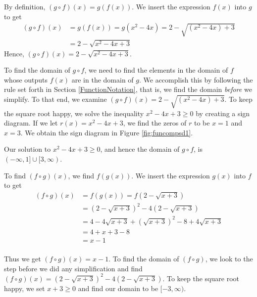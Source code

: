 {
By definition, $(g \circ f)(x) = g(f(x))$. 
We insert the expression $f(x)$ into $g$ to get  
\begin{align*}
(g \circ f)(x) &= g(f(x)) = g\left(x^2-4x\right) = 2 - \sqrt{\left(x^2-4x\right)+3}\\
& = 2 - \sqrt{x^2-4x+3}
\end{align*}
Hence, $(g \circ f)(x) = 2 - \sqrt{x^2-4x+3}$.

To find the domain of $g \circ f$, we need to find the elements in the domain of $f$ whose outputs $f(x)$ are in the domain of $g$.  We accomplish this by following the rule set forth in Section \ref{FunctionNotation}, that is, we find the domain \textit{before} we simplify.  To that end, we examine $(g \circ f)(x) = 2 - \sqrt{\left(x^2-4x\right)+3}$.  To keep the square root happy, we solve the inequality $x^2-4x+3 \geq 0$ by creating a sign diagram.  If we let $r(x) = x^2-4x+3$, we find the zeros of $r$ to be $x = 1$ and $x = 3$.  We obtain the sign diagram in Figure \ref{fig:funcompsd1}.


Our solution to $x^2-4x+3 \geq 0$, and hence the domain of $g \circ f$, is $(-\infty, 1] \cup [3,\infty)$.

\medskip

To find $(f \circ g)(x)$, we find $f(g(x))$. 
 We insert the expression $g(x)$ into $f$ to get  
\begin{align*}
(f \circ g)(x) & =  f(g(x)) = f\left(2-\sqrt{x+3}\right)  \\
 & =  \left(2-\sqrt{x+3}\right)^2 - 4\left(2-\sqrt{x+3}\right)  \\ 
 & =  4 - 4\sqrt{x+3} + \left(\sqrt{x+3}\right)^2 - 8 + 4 \sqrt{x+3}  \\ 
 & =  4 + x+3 - 8  \\ 
 & =  x-1  \\
 \end{align*}

Thus we get $(f \circ g)(x) = x-1$.  To find the domain of $(f \circ g)$, we look to the step before we did any simplification and find $(f \circ g)(x) = \left(2-\sqrt{x+3}\right)^2 - 4\left(2-\sqrt{x+3}\right)$.  To keep the square root happy, we set $x+3 \geq 0$ and find our domain to be $[-3, \infty)$.  
}\\

